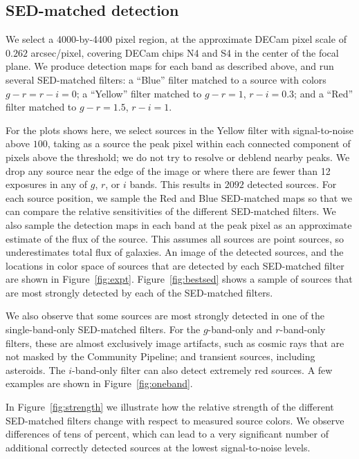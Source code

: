\documentclass[11pt,letterpaper,linenumbers]{aastex63}
\newcommand{\figref}[1]{\mbox{Figure~\ref{#1}}}
\begin{document}
\subsection{SED-matched detection}


We select a 4000-by-4400 pixel region, at the approximate DECam pixel
scale of $0.262$ arcsec/pixel, covering DECam chips N4 and S4 in the
center of the focal plane.  We produce detection maps for each band as
described above, and run several SED-matched filters: a ``Blue''
filter matched to a source with colors $g - r = r - i = 0$; a
``Yellow'' filter matched to $g - r = 1$, $r - i = 0.3$; and a ``Red''
filter matched to $g - r = 1.5$, $r - i = 1$.

For the plots shows here, we select sources in the Yellow filter with
signal-to-noise above $100$, taking as a source the peak pixel within
each connected component of pixels above the threshold; we do not try
to resolve or deblend nearby peaks.  We drop any source near the edge
of the image or where there are fewer than 12 exposures in any of $g$,
$r$, or $i$ bands.  This results in $2092$ detected sources.  For each
source position, we sample the Red and Blue SED-matched maps so that
we can compare the relative sensitivities of the different SED-matched
filters.  We also sample the detection maps in each band at the peak
pixel as an approximate estimate of the flux of the source.  This
assumes all sources are point sources, so underestimates total flux of
galaxies.  An image of the detected sources, and the locations in
color space of sources that are detected by each SED-matched filter
are shown in \figref{fig:expt}.  \figref{fig:bestsed} shows a sample
of sources that are most strongly detected by each of the SED-matched
filters.

We also observe that some sources are most strongly detected in one of
the single-band-only SED-matched filters.  For the $g$-band-only and
$r$-band-only filters, these are almost exclusively image artifacts,
such as cosmic rays that are not masked by the Community Pipeline; and
transient sources, including asteroids.  The $i$-band-only filter can
also detect extremely red sources.  A few examples are shown in
\figref{fig:oneband}.

In \figref{fig:strength} we illustrate how the relative strength of
the different SED-matched filters change with respect to measured
source colors.  We observe differences of tens of percent, which can
lead to a very significant number of additional correctly detected sources at
the lowest signal-to-noise levels.
\end{document}
